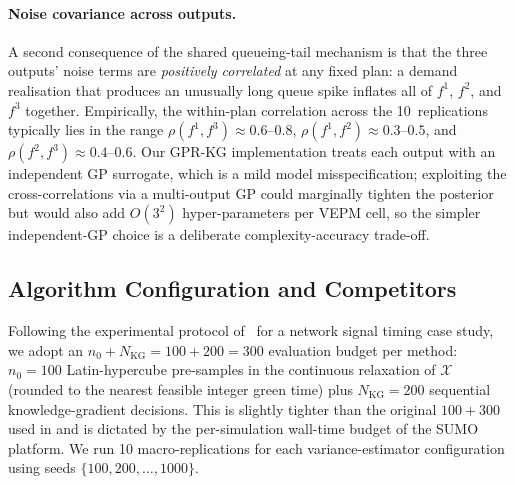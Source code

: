 \documentclass[12pt]{article}
\theoremstyle{plain}
\theoremstyle{definition}
\theoremstyle{remark}
\begin{document}
\paragraph{Noise covariance across outputs.}
A second consequence of the shared queueing-tail mechanism is that the
three outputs' noise terms are \emph{positively correlated} at any
fixed plan: a demand realisation that produces an unusually long queue
spike inflates all of $f^{1}$, $f^{2}$, and $f^{3}$ together.
Empirically, the within-plan correlation across the 10~replications
typically lies in the range $\rho(f^{1},f^{3})\approx 0.6$--$0.8$,
$\rho(f^{1},f^{2})\approx 0.3$--$0.5$, and $\rho(f^{2},f^{3})\approx
0.4$--$0.6$.  Our GPR-KG implementation treats each output with an
independent GP surrogate, which is a mild model misspecification;
exploiting the cross-correlations via a multi-output GP could
marginally tighten the posterior but would also add $O(3^{2})$
hyper-parameters per VEPM cell, so the simpler independent-GP choice
is a deliberate complexity-accuracy trade-off.


\subsection{Algorithm Configuration and Competitors}\label{subsec:case_config}

Following the experimental protocol of~\citep{ZhengXueXuRan2019a} for a
network signal timing case study, we adopt an
$n_{0}+N_{\mathrm{KG}}=100+200=300$ evaluation budget per method:
$n_{0}=100$ Latin-hypercube pre-samples in the continuous relaxation of
$\mathcal{X}$ (rounded to the nearest feasible integer green time) plus
$N_{\mathrm{KG}}=200$ sequential knowledge-gradient decisions.  This is
slightly tighter than the original $100+300$ used in \citep{ZhengXueXuRan2019a}
and is dictated by the per-simulation wall-time budget of the SUMO
platform.  We run 10 macro-replications for each variance-estimator
configuration using seeds $\{100,200,\ldots,1000\}$.
\end{document}
